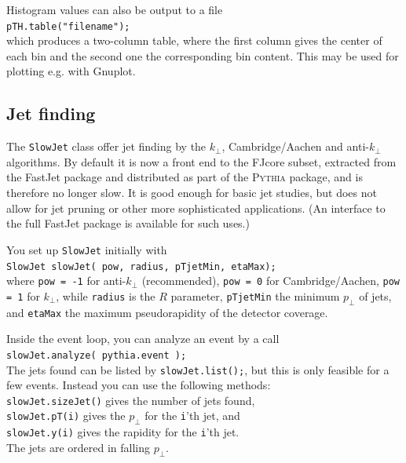 \documentclass[12pt,a4paper]{article}
\newcommand{\kT}{k_{\perp}}
\newcommand{\pT}{p_{\perp}}
\begin{document}
Histogram values can also be output to a file\\
\hspace*{10mm}\texttt{pTH.table("filename");}\\ 
which produces a two-column table, where the first column gives the 
center of each bin and the second one the corresponding bin content.
This may be used for plotting e.g. with Gnuplot.

\subsection{Jet finding}

The \texttt{SlowJet} class offer jet finding by the $\kT$,
Cambridge/Aachen and anti-$\kT$ algorithms. By default it is now 
a front end to the FJcore subset, extracted from the FastJet package 
\cite{fastjet} and distributed as part of the \textsc{Pythia} package, 
and is therefore 
no longer slow. It is good enough for basic jet studies, but does not 
allow for jet pruning or other more sophisticated applications. 
(An interface to the full FastJet package is available for such uses.)

You set up \texttt{SlowJet} initially with\\
\hspace*{10mm}\texttt{SlowJet slowJet( pow, radius, pTjetMin, etaMax);}\\
where \texttt{pow = -1} for anti-$\kT$ (recommended), \texttt{pow = 0} 
for Cambridge/Aachen, \texttt{pow = 1} for $\kT$,  while \texttt{radius} 
is the $R$ parameter, \texttt{pTjetMin} the minimum $\pT$ of jets, and 
\texttt{etaMax} the maximum pseudorapidity of the detector coverage. 

Inside the event loop, you can analyze an event by a call\\
\hspace*{10mm}\texttt{slowJet.analyze( pythia.event );}\\
The jets found can be listed by \texttt{slowJet.list();}, but this 
is only feasible for a few events. Instead you can use the following
methods:\\
\hspace*{10mm}\texttt{slowJet.sizeJet()} gives the number of jets found,\\
\hspace*{10mm}\texttt{slowJet.pT(i)} gives the $\pT$ for the 
\texttt{i}'th jet, and\\
\hspace*{10mm}\texttt{slowJet.y(i)} gives the rapidity for the 
\texttt{i}'th jet.\\
The jets are ordered in falling $\pT$. 
\end{document}
